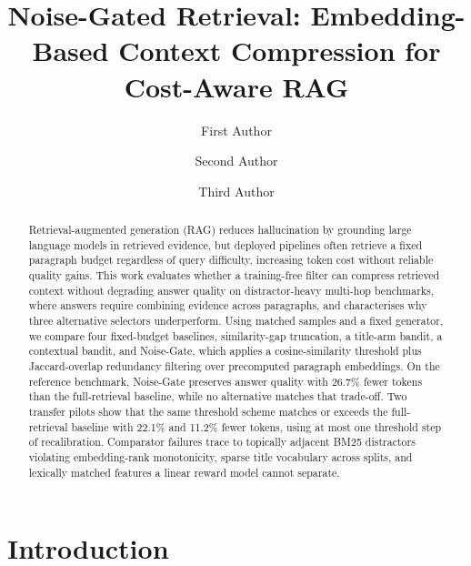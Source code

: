 \documentclass[runningheads]{llncs}
\begin{document}
%
\title{Noise-Gated Retrieval: Embedding-Based Context Compression for Cost-Aware RAG}
%
\author{First Author \and
Second Author \and
Third Author}
%
%
%
\maketitle              %
%
\begin{abstract}
Retrieval-augmented generation (RAG) reduces hallucination by grounding large language models in retrieved evidence, but deployed pipelines often retrieve a fixed paragraph budget regardless of query difficulty, increasing token cost without reliable quality gains. This work evaluates whether a training-free filter can compress retrieved context without degrading answer quality on distractor-heavy multi-hop benchmarks, where answers require combining evidence across paragraphs, and characterises why three alternative selectors underperform. Using matched samples and a fixed generator, we compare four fixed-budget baselines, similarity-gap truncation, a title-arm bandit, a contextual bandit, and Noise-Gate, which applies a cosine-similarity threshold plus Jaccard-overlap redundancy filtering over precomputed paragraph embeddings. On the reference benchmark, Noise-Gate preserves answer quality with 26.7\% fewer tokens than the full-retrieval baseline, while no alternative matches that trade-off. Two transfer pilots show that the same threshold scheme matches or exceeds the full-retrieval baseline with 22.1\% and 11.2\% fewer tokens, using at most one threshold step of recalibration. Comparator failures trace to topically adjacent BM25 distractors violating embedding-rank monotonicity, sparse title vocabulary across splits, and lexically matched features a linear reward model cannot separate.

\end{abstract}

\section{Introduction}
\label{sec:introduction}
\end{document}
